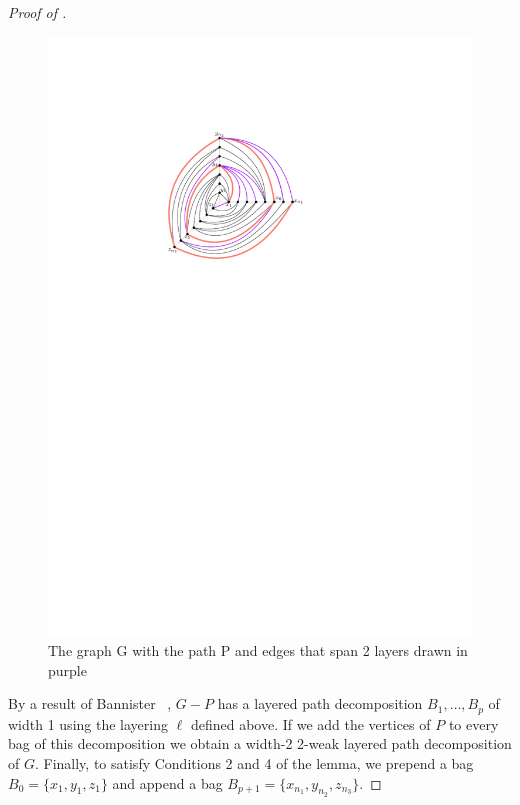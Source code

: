 \documentclass{patmorin}
\begin{document}
\begin{proof}[Proof of ]
  \begin{figure}
   \begin{center}
      \includegraphics{figs/prism_graph-3}
   \end{center}
   \caption{The graph G with the path P and edges that span 2 layers drawn in purple}
  \end{figure}

  By a result of Bannister \etal\ \cite[Proof of
  Theorem~5]{bannister2018track}, $G-P$ has a layered
  path decomposition $B_1,\ldots,B_p$ of width 1 using the layering 
  $\ell$ defined above.  If we add the vertices of $P$ to every bag
  of this decomposition we obtain a width-2 2-weak layered path
  decomposition of $G$.  Finally, to satisfy Conditions 2 and 4 of
  the lemma, we prepend a bag $B_0=\{x_1,y_1,z_1\}$ and append a bag
  $B_{p+1}=\{x_{n_1},y_{n_2},z_{n_3}\}$.
\end{proof}
\end{document}
